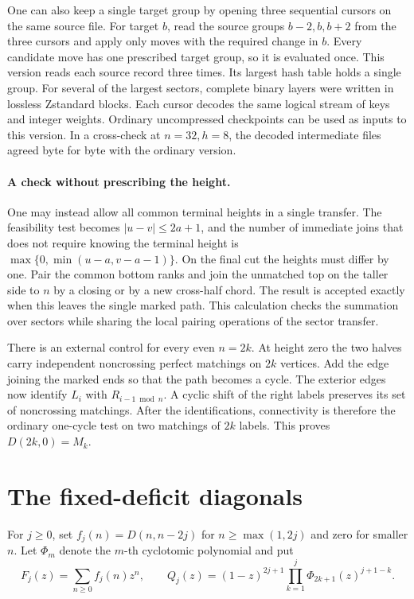 One can also keep a single target group by opening three sequential
cursors on the same source file. For target \(b\), read the source
groups \(b-2,b,b+2\) from the three cursors and apply only moves with
the required change in \(b\). Every candidate move has one prescribed
target group, so it is evaluated once. This version reads each source
record three times. Its largest hash table holds a single group.
For several of the largest sectors, complete binary layers were
written in lossless Zstandard blocks. Each cursor decodes the same
logical stream of keys and integer weights. Ordinary uncompressed
checkpoints can be used as inputs to this version. In a cross-check
at \(n=32,h=8\), the decoded intermediate files agreed byte for byte
with the ordinary version.

\paragraph{A check without prescribing the height.}
One may instead allow all common terminal heights in a single transfer.
The feasibility test becomes \(|u-v|\le2a+1\), and the number of
immediate joins that does not require knowing the terminal height is
\(\max\{0,\min(u-a,v-a-1)\}\). On the final cut the heights must differ by
one. Pair the common bottom ranks and join the unmatched top on the taller side
to \(n\) by a closing or by a new cross-half chord. The result
is accepted exactly when this leaves the single marked path. This
calculation checks the summation over sectors while sharing the local
pairing operations of the sector transfer.

There is an external control for every even \(n=2k\). At height zero
the two halves carry independent noncrossing perfect matchings on \(2k\)
vertices. Add the edge joining the marked ends so that the path becomes
a cycle. The exterior edges now identify \(L_i\) with \(R_{i-1\bmod n}\).
A cyclic shift of the right labels preserves its set of noncrossing
matchings. After the identifications, connectivity is therefore the
ordinary one-cycle test on two matchings of \(2k\) labels. This proves
\(D(2k,0)=M_k\).

\section{The fixed-deficit diagonals}
\label{sec:axis-diagonals}

For \(j\ge0\), set \(f_j(n)=D(n,n-2j)\) for \(n\ge\max(1,2j)\) and
zero for smaller \(n\). Let \(\Phi_m\) denote the \(m\)-th cyclotomic
polynomial and put
\[
 F_j(z)=\sum_{n\ge0}f_j(n)z^n,\qquad
 Q_j(z)=(1-z)^{2j+1}\prod_{k=1}^j\Phi_{2k+1}(z)^{j+1-k}.
\]

